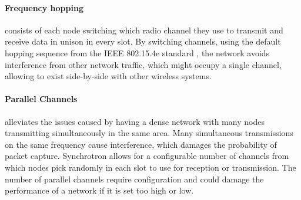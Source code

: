 \paragraph*{Frequency hopping} consists of each node switching which radio channel they use to transmit and receive data in unison in every slot. By switching channels, using the default hopping sequence from the IEEE 802.15.4e standard \cite{IEEE-802-15-4}, the network avoids interference from other network traffic, which might occupy a single channel, allowing \atwo{} to exist side-by-side with other wireless systems. 

\paragraph*{Parallel Channels} alleviates the issues caused by having a dense network with many nodes transmitting simultaneously in the same area. Many simultaneous transmissions on the same frequency cause interference, which damages the probability of packet capture. Synchrotron allows for a configurable number of channels from which nodes pick randomly in each slot to use for reception or transmission. The number of parallel channels require configuration and could damage the performance of a network if it is set too high or low.



